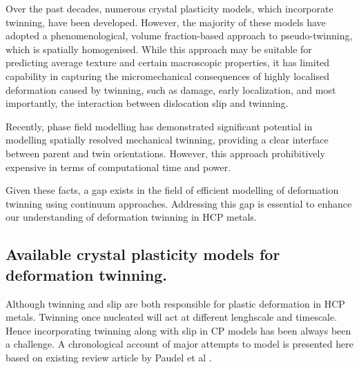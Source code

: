 Over the past decades, numerous crystal plasticity models, which incorporate twinning, have been developed. However, the majority of these models have adopted a phenomenological, volume fraction-based approach to pseudo-twinning, which is spatially homogenised. While this approach may be suitable for predicting average texture and certain macroscopic properties, it has limited capability in capturing the micromechanical consequences of highly localised deformation caused by twinning, such as damage, early localization, and most importantly, the interaction between dislocation slip and twinning.

Recently, phase field modelling has demonstrated significant potential in modelling spatially resolved mechanical twinning, providing a clear interface between parent and twin orientations. However, this approach prohibitively expensive in terms of computational time and power.

Given these facts, a gap exists in the field of efficient modelling of deformation twinning using continuum approaches. Addressing this gap is essential to enhance our understanding of deformation twinning in HCP metals.

\subsection{Available crystal plasticity models for deformation twinning.}

Although twinning and slip are both responsible for plastic deformation in HCP metals. Twinning once nucleated will act at different lenghscale and timescale. Hence incorporating twinning along with slip in CP models has been always been a challenge. A chronological account of major attempts to model is presented here based on existing review article by Paudel et al \cite{Paduel202111091373}.
\vspace{-0.8em}
